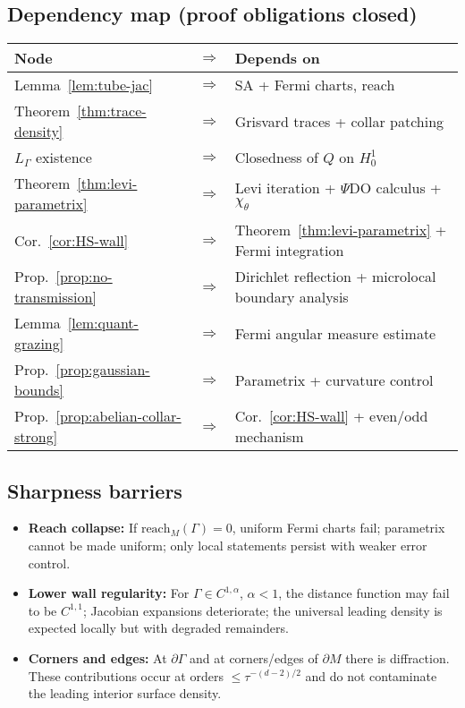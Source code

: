 \subsection{Dependency map (proof obligations closed)}
\begin{center}
\begin{tabular}{lcl}
\textbf{Node} & $\Rightarrow$ & \textbf{Depends on} \\
\hline
Lemma~\ref{lem:tube-jac} & $\Rightarrow$ & SA + Fermi charts, reach \\
Theorem~\ref{thm:trace-density} & $\Rightarrow$ & Grisvard traces + collar patching \\
$L_\Gamma$ existence & $\Rightarrow$ & Closedness of $Q$ on $H^1_0$ \\
Theorem~\ref{thm:levi-parametrix} & $\Rightarrow$ & Levi iteration + $\Psi$DO calculus + $\chi_\theta$ \\
Cor.~\ref{cor:HS-wall} & $\Rightarrow$ & Theorem~\ref{thm:levi-parametrix} + Fermi integration \\
Prop.~\ref{prop:no-transmission} & $\Rightarrow$ & Dirichlet reflection + microlocal boundary analysis \\
Lemma~\ref{lem:quant-grazing} & $\Rightarrow$ & Fermi angular measure estimate \\
Prop.~\ref{prop:gaussian-bounds} & $\Rightarrow$ & Parametrix + curvature control \\
Prop.~\ref{prop:abelian-collar-strong} & $\Rightarrow$ & Cor.~\ref{cor:HS-wall} + even/odd mechanism \\
\end{tabular}
\end{center}

\subsection{Sharpness barriers}
\begin{itemize}
  \item \textbf{Reach collapse:} If $\mathrm{reach}_M(\Gamma)=0$, uniform Fermi charts fail; parametrix cannot be made uniform; only local statements persist with weaker error control.
  \item \textbf{Lower wall regularity:} For $\Gamma\in C^{1,\alpha}$, $\alpha<1$, the distance function may fail to be $C^{1,1}$; Jacobian expansions deteriorate; the universal leading density is expected locally but with degraded remainders.
  \item \textbf{Corners and edges:} At $\partial\Gamma$ and at corners/edges of $\partial M$ there is diffraction. These contributions occur at orders $\le \tau^{-(d-2)/2}$ and do not contaminate the leading interior surface density.
\end{itemize}

